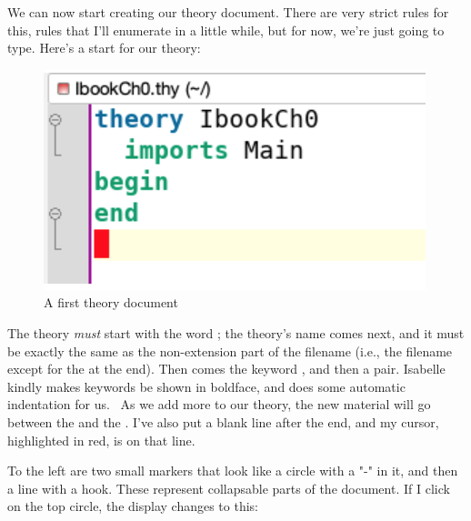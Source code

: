 

We can now start creating our theory document. There are very strict rules for this, rules that I'll enumerate in a little while, but for now, we're just going to type. Here's a start for our theory:

\begin{figure}[h]
    \centering
    \includegraphics[width=0.25\linewidth]{first-theory.png}
    \caption{A first theory document}
    \label{fig:first-theory-doc}
\end{figure}
The theory \textit{must} start with the word ; the theory's name comes next, and it must be exactly the same as the non-extension part of the filename (i.e., the filename except for the  at the end). Then comes the keyword , and then a  pair. Isabelle kindly makes keywords be shown in boldface, and does some automatic indentation for us.  As we add more to our theory, the new material will go between the  and the . I've also put a blank line after the end, and my cursor, highlighted in red, is on that line. 

To the left are two small markers that look like a circle with a "-" in it, and then a line with a hook. These represent collapsable parts of the document. If I click on the top circle, the display changes to this:

